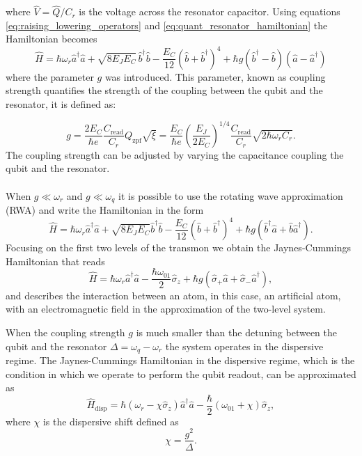 where $\hat{V} = \hat{Q}/C_r$ is the voltage across the resonator capacitor. Using equations \ref{eq:raising_lowering_operators} and \ref{eq:quant_resonator_hamiltonian} the Hamiltonian becomes
\begin{equation}
    \hat{H} = \hbar \omega_r \hat{a}^\dagger \hat{a}  + \sqrt{8 E_J E_C} \, \hat{b}^\dagger \hat{b} - \frac{E_C}{12} (\hat{b} + \hat{b}^\dagger)^4 + \hbar g (\hat{b}^\dagger - \hat{b})(\hat{a} - \hat{a}^\dagger)
\end{equation}
where the parameter $g$ was introduced. This parameter, known as coupling strength quantifies the strength of the coupling between the qubit and the resonator, it is defined as:

\begin{equation}
    g = \frac{2 E_C}{\hbar e} \frac{C_{\text{read}}}{C_r} Q_{\text{zpf}} \sqrt{\xi} = \frac{E_C}{\hbar e} \left( \frac{E_J}{2 E_C} \right)^{1/4} \frac{C_{\text{read}}}{C_r} \sqrt{2 \hbar \omega_r C_r}.
\end{equation} 
The coupling strength can be adjusted by varying the capacitance coupling the qubit and the resonator.

\paragraph{}
When $g\ll\omega_r$ and $g\ll\omega_q$ it is possible to use the rotating wave approximation (RWA) and write the Hamiltonian in the form
\begin{equation}
    \hat{H} = \hbar \omega_r \hat{a}^\dagger \hat{a} + \sqrt{8E_J E_C} \hat{b}^\dagger \hat{b} - \frac{E_C}{12} (\hat{b} + \hat{b}^\dagger)^4 + \hbar g (\hat{b}^\dagger \hat{a} + \hat{b} \hat{a}^\dagger).
\end{equation}
Focusing on the first two levels of the transmon we obtain the Jaynes-Cummings Hamiltonian \cite{1443594} that reads
\begin{equation}\label{eq:Jaynes-Cummings}
    \hat{H} = \hbar \omega_r \hat{a}^\dagger \hat{a} - \frac{\hbar \omega_{01}}{2} \hat{\sigma}_z + \hbar g (\hat{\sigma}_+ \hat{a} + \hat{\sigma}_- \hat{a}^\dagger),
\end{equation}
and describes the interaction between an atom, in this case, an artificial atom, with an electromagnetic field in the approximation of the two-level system.

When the coupling strength $g$ is much smaller than the detuning between the qubit and the resonator $\Delta = \omega_q -\omega_r $ the system operates in the dispersive regime.
The Jaynes-Cummings Hamiltonian in the dispersive regime, which is the condition in which we operate to perform the qubit readout, can be approximated as 
\begin{equation}\label{eq:dispersiveshift_hamiltonian}
    \hat{H}_{\text{disp}} = \hbar (\omega_r - \chi \hat{\sigma}_z) \hat{a}^\dagger \hat{a} - \frac{\hbar}{2} (\omega_{01} + \chi) \hat{\sigma}_z,
\end{equation}
where $\chi$ is the dispersive shift defined as \begin{equation}\label{eq:dispersiveshift}
    \chi = \frac{g^2}{\Delta}.
\end{equation}

